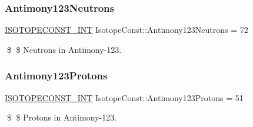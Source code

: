 \subsubsection{\texorpdfstring{Antimony123\+Neutrons}{Antimony123Neutrons}}
{\footnotesize\ttfamily \mbox{\hyperlink{group___isotope_const-_macros_ga5f18360b3e99483a35c32d789e62621c}{I\+S\+O\+T\+O\+P\+E\+C\+O\+N\+S\+T\+\_\+\+I\+NT}} Isotope\+Const\+::\+Antimony123\+Neutrons = 72}

\$ \$ Neutrons in Antimony-\/123. \mbox{\label{group___isotope_const-_antimony-_sb123_ga9a8ef937b92f03f605963370e338c90e}} 
\subsubsection{\texorpdfstring{Antimony123\+Protons}{Antimony123Protons}}
{\footnotesize\ttfamily \mbox{\hyperlink{group___isotope_const-_macros_ga5f18360b3e99483a35c32d789e62621c}{I\+S\+O\+T\+O\+P\+E\+C\+O\+N\+S\+T\+\_\+\+I\+NT}} Isotope\+Const\+::\+Antimony123\+Protons = 51}

\$ \$ Protons in Antimony-\/123. 